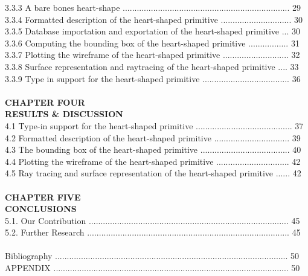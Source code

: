\documentclass[11pt, oneside]{Thesis} %
\begin{document}
3.3.3 A bare bones heart-shape ....................................................................... 29\\
3.3.4 Formatted description of the heart-shaped primitive .............................. 30\\
3.3.5 Database importation and exportation of the heart-shaped primitive ... 30\\
3.3.6 Computing the bounding box of the heart-shaped primitive ................. 31\\
3.3.7 Plotting the wireframe of the heart-shaped primitive ............................ 32\\
3.3.8 Surface representation and raytracing of the heart-shaped primitive .... 33\\
3.3.9 Type in support for the heart-shaped primitive ..................................... 36\\\\
\hspace*{150}			\textbf{CHAPTER FOUR}\\
\hspace*{125}		 \textbf{RESULTS \& DISCUSSION}\\
4.1 Type-in support for the heart-shaped primitive ......................................... 37\\
4.2 Formatted description of the heart-shaped primitive ................................ 39\\
4.3 The bounding box of the heart-shaped primitive ......................................  40\\
4.4 Plotting the wireframe of the heart-shaped primitive ............................... 42\\
4.5 Ray tracing and surface representation of the heart-shaped primitive ...... 42\\\\
\hspace*{150}			\textbf{CHAPTER FIVE}\\
\hspace*{155}			\textbf{CONCLUSIONS}\\
5.1. Our Contribution ..................................................................................... 45\\
5.2. Further Research ...................................................................................... 45\\
\\
Bibliography ................................................................................................... 50\\
APPENDIX .................................................................................................... 50\\
\end{document}
